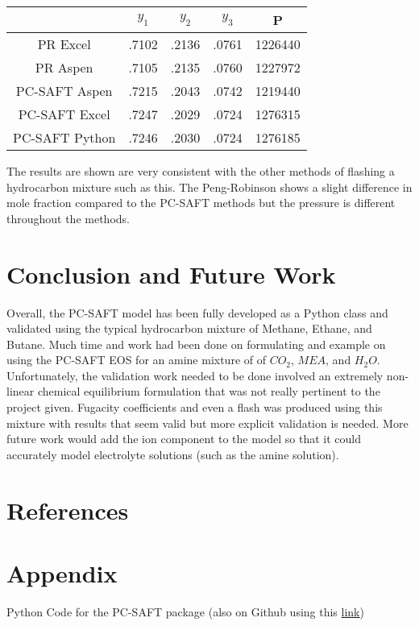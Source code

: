 \documentclass[12pt, letterpaper]{article}
\begin{document}
\begin{table}[]
\centering
\begin{tabular}{|c|c|c|c|c|}
\hline
               & $y_1$ & $y_2$ & $y_3$ & P       \\ \hline
PR Excel       & .7102 & .2136 & .0761 & 1226440 \\ \hline
PR Aspen       & .7105 & .2135 & .0760 & 1227972 \\ \hline
PC-SAFT Aspen  & .7215 & .2043 & .0742 & 1219440 \\ \hline
PC-SAFT Excel  & .7247 & .2029 & .0724 & 1276315 \\ \hline
PC-SAFT Python & .7246 & .2030 & .0724 & 1276185 \\ \hline
\end{tabular}
\end{table}

The results are shown are very consistent with the other methods of flashing a hydrocarbon mixture such as this. The Peng-Robinson shows a slight difference in mole fraction compared to the PC-SAFT methods but the pressure is different throughout the methods.


\section{Conclusion and Future Work}
Overall, the PC-SAFT model has been fully developed as a Python class and validated using the typical hydrocarbon mixture of Methane, Ethane, and Butane.
Much time and work had been done on formulating and example on using the PC-SAFT EOS for an amine mixture of of $CO_2$, $MEA$, and $H_2O$. Unfortunately, the validation work needed to be done involved an extremely non-linear chemical equilibrium formulation that was not really pertinent to the project given. Fugacity coefficients and even a flash was produced using this mixture with results that seem valid but more explicit validation is needed. More future work would add the ion component to the model so that it could accurately model electrolyte solutions (such as the amine solution).


\newpage
\section{References}
\printbibliography


\newpage
\appendix
\section{Appendix}
Python Code for the PC-SAFT package (also on Github using this \href{https://github.com/tannerpolley/ePC_SAFT}{link})


\end{document}

